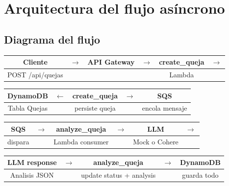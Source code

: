 \documentclass[11pt,a4paper,oneside]{article}
\begin{document}
\section{Arquitectura del flujo as\'incrono}

\subsection{Diagrama del flujo}

\begin{center}
\begin{tabular}{|c|c|c|c|c|c|}
\hline
\textbf{Cliente} & $\rightarrow$ & \textbf{API Gateway} & $\rightarrow$ & \textbf{create\_queja} & $\rightarrow$ \\
\hline
POST /api/quejas & & & & Lambda & \\
\hline
\end{tabular}
\end{center}

\begin{center}
\begin{tabular}{|c|c|c|c|c|}
\hline
\textbf{DynamoDB} & $\leftarrow$ & \textbf{create\_queja} & $\rightarrow$ & \textbf{SQS} \\
\hline
Tabla Quejas & & persiste queja & & encola mensaje \\
\hline
\end{tabular}
\end{center}

\begin{center}
\begin{tabular}{|c|c|c|c|c|c|}
\hline
\textbf{SQS} & $\rightarrow$ & \textbf{analyze\_queja} & $\rightarrow$ & \textbf{LLM} & $\rightarrow$ \\
\hline
dispara & & Lambda consumer & & Mock o Cohere & \\
\hline
\end{tabular}
\end{center}

\begin{center}
\begin{tabular}{|c|c|c|c|c|}
\hline
\textbf{LLM response} & $\rightarrow$ & \textbf{analyze\_queja} & $\rightarrow$ & \textbf{DynamoDB} \\
\hline
Analisis JSON & & update status + analysis & & guarda todo \\
\hline
\end{tabular}
\end{center}
\end{document}
